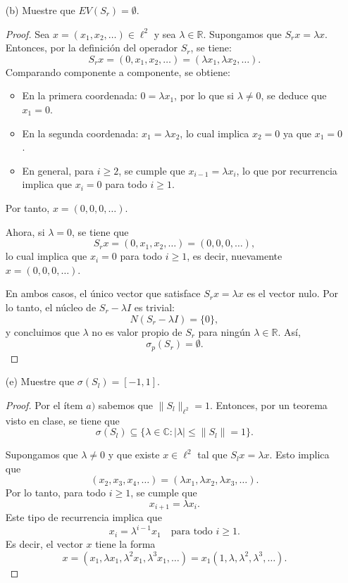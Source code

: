 \begin{enumerate}
    \item[(b)] Muestre que \( EV(S_{r}) = \emptyset \).
    \begin{proof}
        Sea \( x = (x_1, x_2, \ldots) \in \ell^2 \) y sea \( \lambda \in \mathbb{R} \). Supongamos que \( S_r x = \lambda x \). Entonces, por la definición del operador \( S_r \), se tiene:
\[
S_r x = (0, x_1, x_2, \ldots) = (\lambda x_1, \lambda x_2, \ldots).
\]
Comparando componente a componente, se obtiene:
\begin{itemize}
    \item  En la primera coordenada: \( 0 = \lambda x_1 \), por lo que si \( \lambda \neq 0 \), se deduce que \( x_1 = 0 \).
\item  En la segunda coordenada: \( x_1 = \lambda x_2 \), lo cual implica \( x_2 = 0 \) ya que \( x_1 = 0 \).
\item  En general, para \( i \geq 2 \), se cumple que \( x_{i-1} = \lambda x_i \), lo que por recurrencia implica que \( x_i = 0 \) para todo \( i \geq 1 \).
\end{itemize}



Por tanto, \( x = (0, 0, 0, \ldots) \).

Ahora, si \( \lambda = 0 \), se tiene que
\[
S_r x = (0, x_1, x_2, \ldots) = (0, 0, 0, \ldots),
\]
lo cual implica que \( x_i = 0 \) para todo \( i \geq 1 \), es decir, nuevamente \( x = (0, 0, 0, \ldots) \).

En ambos casos, el único vector que satisface \( S_r x = \lambda x \) es el vector nulo. Por lo tanto, el núcleo de \( S_r - \lambda I \) es trivial:
\[
N(S_r - \lambda I) = \{0\},
\]
y concluimos que \( \lambda \) no es valor propio de \( S_r \) para ningún \( \lambda \in \mathbb{R} \). Así,
\[
\sigma_p(S_r) = \emptyset.
\]

    \end{proof}
    
    
     \item[(e)] Muestre que \( \sigma(S_{l}) = [-1, 1] \).
    \begin{proof}
        Por el ítem $a)$ sabemos que $\|S_l\|_{\ell^2} = 1$. Entonces, por un teorema visto en clase, se tiene que
\[
\sigma(S_l) \subseteq \{ \lambda \in \mathbb{C} : |\lambda| \leq \|S_l\| = 1 \}.
\]

Supongamos que $\lambda \neq 0$ y que existe $x \in \ell^2$ tal que \( S_l x = \lambda x \). Esto implica que
\[
(x_2, x_3, x_4, \dots) = (\lambda x_1, \lambda x_2, \lambda x_3, \dots).
\]
Por lo tanto, para todo \( i \geq 1 \), se cumple que
\[
x_{i+1} = \lambda x_i.
\]
Este tipo de recurrencia implica que
\[
x_i = \lambda^{i-1} x_1 \quad \text{para todo } i \geq 1.
\]
Es decir, el vector \( x \) tiene la forma
\[
x = (x_1, \lambda x_1, \lambda^2 x_1, \lambda^3 x_1, \dots) = x_1 (1, \lambda, \lambda^2, \lambda^3, \dots).
\]


\end{proof}
\end{enumerate}
